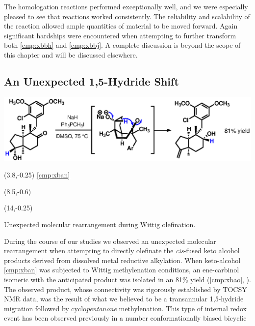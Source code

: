 The homologation reactions performed exceptionally well, and we were especially pleased to see that
reactions worked consistently. The reliability and scalability of the reaction allowed ample
quantities of material to be moved forward. Again significant hardships were encountered when
attempting to further transform both
\ref{cmp:xbbh} and \ref{cmp:xbbj}. A complete discussion is beyond the scope of this chapter and will be discussed elsewhere.


\subsection{An Unexpected 1,5-Hydride Shift}
\label{sec:hydride}

\begin{Scheme}[b]
  \centering
  \includegraphics[scale=0.8]{chp_singlecarbon/images/hydrideone}
  \begin{textblock}{1}(3.8,-0.25) \textsf{\scriptsize{\ref{cmp:xban}}} \end{textblock}
  \begin{textblock}{1}(8.5,-0.6)   \end{textblock}
  \begin{textblock}{1}(14,-0.25)   \end{textblock}
  \caption{Unexpected molecular rearrangement during Wittig olefination.}
  \label{sch:hydrideone}
\end{Scheme}
During the course of our studies we observed an unexpected molecular rearrangement when attempting
to directly olefinate the \textit{cis}-fused keto alcohol products derived from
dissolved metal reductive alkylation.
When keto-alcohol \ref{cmp:xban} was subjected to Wittig methylenation conditions, an ene-carbinol
isomeric with the anticipated product was isolated in an 81\% yield
(\ce{->}\ref{cmp:xbao}, ).
The observed product, whose connectivity was rigorously established by TOCSY NMR data, was the result of what we believed to be
a transannular 1,5-hydride migration followed by cyclo\textit{pentanone} methylenation. This type of
internal redox event has been observed previously in a number conformationally biased bicyclic
